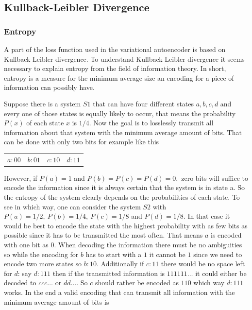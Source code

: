 \subsection{Kullback-Leibler Divergence} \label{KL-Divergence}

\subsubsection{Entropy}

A part of the loss function used in the variational autoencoder is based on Kullback-Leibler divergence.
To understand Kullback-Leibler divergence it seems necessary to explain entropy from
the field of information theory. In short, entropy is a measure for the minimum average size an
encoding for a piece of information can possibly have.

Suppose there is a system $S1$ that can have four different states $a, b, c, d$
and every one of those states is equally likely to occur, that means the probability $P(x)$
of each state $x$ is $1/4$. Now the goal is to losslessly transmit all information about that system
with the minimum average amount of bits. That can be done with only two bits for example like this

\begin{center}
    \begin{tabular} {c c c c}
        $a: 00$ & $b: 01$ & $c: 10$ & $d: 11$
    \end{tabular}
\end{center}

However, if $P(a)=1$ and $P(b)=P(c)=P(d)=0,$ zero bits will suffice to encode the information since
it is always certain that the system is in state a. So the entropy of the system clearly depends on
the probabilities of each state. To see in which way, one can consider the system $S2$ with 
$P(a)=1/2,\ P(b)=1/4,\ P(c)=1/8$ and $P(d)=1/8$. In that case it would be best to encode the state
with the highest probability with as few bits as possible since it has to be transmitted the most
often. That means $a$ is encoded with one bit as $0$. When decoding the information there must be
no ambiguities so while the encoding for $b$ has to start with a $1$ it cannot be $1$ since we need 
to encode two more states so $b: 10$. Additionally if $c: 11$ there would be no space left for $d$:
say $d: 111$ then if the transmitted information is $111111\dots$ it could either be decoded to
$ccc\dots$ or $dd\dots$. So $c$ should rather be encoded as $110$ which way $d: 111$ works. In the end a valid
encoding that can transmit all information with the minimum average amount of bits is

